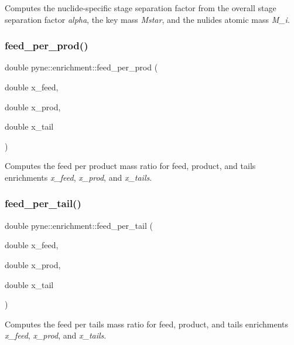 Computes the nuclide-\/specific stage separation factor from the overall stage separation factor {\itshape alpha}, the key mass {\itshape Mstar}, and the nulide\textquotesingle{}s atomic mass {\itshape M\+\_\+i}. \mbox{\label{namespacepyne_1_1enrichment_a3c67817d22ac579e8dec6c2c6b67348b}} 
\subsubsection{\texorpdfstring{feed\+\_\+per\+\_\+prod()}{feed\_per\_prod()}}
{\footnotesize\ttfamily double pyne\+::enrichment\+::feed\+\_\+per\+\_\+prod (\begin{DoxyParamCaption}\item[{double}]{x\+\_\+feed,  }\item[{double}]{x\+\_\+prod,  }\item[{double}]{x\+\_\+tail }\end{DoxyParamCaption})}

Computes the feed per product mass ratio for feed, product, and tails enrichments {\itshape x\+\_\+feed}, {\itshape x\+\_\+prod}, and {\itshape x\+\_\+tails}. \mbox{\label{namespacepyne_1_1enrichment_ac3c2ba735a52b7dab783a4901058430e}} 
\subsubsection{\texorpdfstring{feed\+\_\+per\+\_\+tail()}{feed\_per\_tail()}}
{\footnotesize\ttfamily double pyne\+::enrichment\+::feed\+\_\+per\+\_\+tail (\begin{DoxyParamCaption}\item[{double}]{x\+\_\+feed,  }\item[{double}]{x\+\_\+prod,  }\item[{double}]{x\+\_\+tail }\end{DoxyParamCaption})}

Computes the feed per tails mass ratio for feed, product, and tails enrichments {\itshape x\+\_\+feed}, {\itshape x\+\_\+prod}, and {\itshape x\+\_\+tails}. \mbox{\label{namespacepyne_1_1enrichment_ae198e1b1919eeebccd2f1b1bf60ef3db}} 

